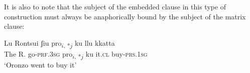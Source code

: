 \documentclass[output=paper]{langscibook}
\begin{document}
\ea\label{ac17}
    \z
\z


It is also to note that the subject of the embedded clause in this type of construction must always be anaphorically bound by the subject of the matrix clause:

\ea \label{ac18}\gll Lu Rontsui   ʃiu      {pro\textsubscript{$i$, *$j$}}  ku  llu    kkatta\\
  The R.     go-\textsc{prf}.\textsc{3sg}  {pro\textsubscript{$i$, *$j$}}  ku  it.\textsc{cl}  buy-\textsc{prs}.\textsc{1sg}  \\
  \glt ‘Oronzo went to buy it’
\z
\end{document}
